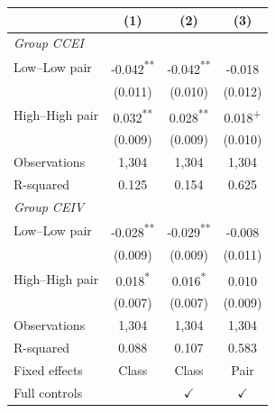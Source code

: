 \begin{tabular}{lccc}\toprule
& (1) & (2) & (3)\\\midrule
\multicolumn{4}{l}{\textit{Group CCEI}}\\[3pt]
Low--Low pair & -0.042\textsuperscript{**} & -0.042\textsuperscript{**} & -0.018\textsuperscript{}\\
 & (0.011) & (0.010) & (0.012)\\
High--High pair & 0.032\textsuperscript{**} & 0.028\textsuperscript{**} & 0.018\textsuperscript{+}\\
 & (0.009) & (0.009) & (0.010)\\
Observations & 1,304 & 1,304 & 1,304\\
R-squared & 0.125 & 0.154 & 0.625\\\midrule
\multicolumn{4}{l}{\textit{Group CEIV}}\\[3pt]
Low--Low pair & -0.028\textsuperscript{**} & -0.029\textsuperscript{**} & -0.008\textsuperscript{}\\
 & (0.009) & (0.009) & (0.011)\\
High--High pair & 0.018\textsuperscript{*} & 0.016\textsuperscript{*} & 0.010\textsuperscript{}\\
 & (0.007) & (0.007) & (0.009)\\
Observations & 1,304 & 1,304 & 1,304\\
R-squared & 0.088 & 0.107 & 0.583\\\midrule
Fixed effects & Class & Class & Pair\\
Full controls & & $\checkmark$ & $\checkmark$\\
\bottomrule\end{tabular}
